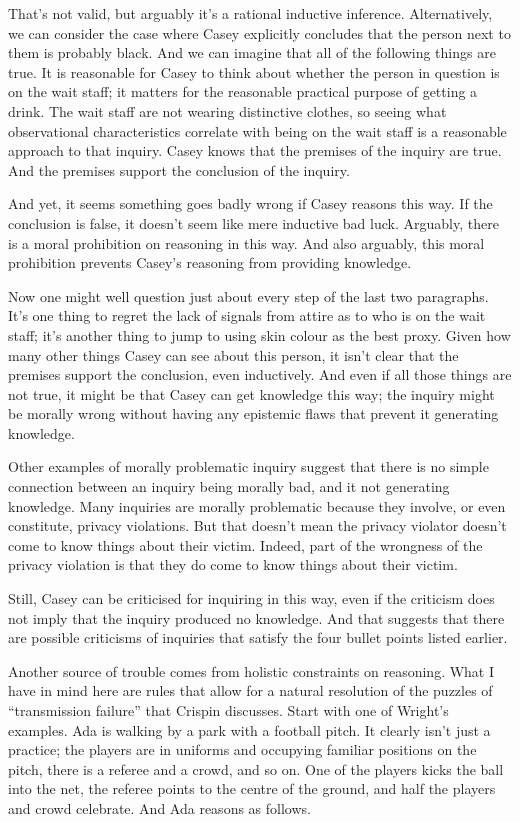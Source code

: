 \documentclass[11pt,]{book}
\begin{document}
That's not valid, but arguably it's a rational inductive inference. Alternatively, we can consider the case where Casey explicitly concludes that the person next to them is probably black. And we can imagine that all of the following things are true. It is reasonable for Casey to think about whether the person in question is on the wait staff; it matters for the reasonable practical purpose of getting a drink. The wait staff are not wearing distinctive clothes, so seeing what observational characteristics correlate with being on the wait staff is a reasonable approach to that inquiry. Casey knows that the premises of the inquiry are true. And the premises support the conclusion of the inquiry.

And yet, it seems something goes badly wrong if Casey reasons this way. If the conclusion is false, it doesn't seem like mere inductive bad luck. Arguably, there is a moral prohibition on reasoning in this way. And also arguably, this moral prohibition prevents Casey's reasoning from providing knowledge.

Now one might well question just about every step of the last two paragraphs. It's one thing to regret the lack of signals from attire as to who is on the wait staff; it's another thing to jump to using skin colour as the best proxy. Given how many other things Casey can see about this person, it isn't clear that the premises support the conclusion, even inductively. And even if all those things are not true, it might be that Casey can get knowledge this way; the inquiry might be morally wrong without having any epistemic flaws that prevent it generating knowledge.

Other examples of morally problematic inquiry suggest that there is no simple connection between an inquiry being morally bad, and it not generating knowledge. Many inquiries are morally problematic because they involve, or even constitute, privacy violations. But that doesn't mean the privacy violator doesn't come to know things about their victim. Indeed, part of the wrongness of the privacy violation is that they do come to know things about their victim.

Still, Casey can be criticised for inquiring in this way, even if the criticism does not imply that the inquiry produced no knowledge. And that suggests that there are possible criticisms of inquiries that satisfy the four bullet points listed earlier.

Another source of trouble comes from holistic constraints on reasoning. What I have in mind here are rules that allow for a natural resolution of the puzzles of ``transmission failure'' that Crispin \citet{Wright2002} discusses. Start with one of Wright's examples. Ada is walking by a park with a football pitch. It clearly isn't just a practice; the players are in uniforms and occupying familiar positions on the pitch, there is a referee and a crowd, and so on. One of the players kicks the ball into the net, the referee points to the centre of the ground, and half the players and crowd celebrate. And Ada reasons as follows.
\end{document}
